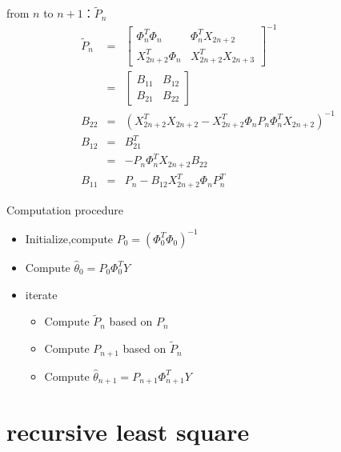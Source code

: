 \begin{frame}{from $n$ to $n+1$：$\tilde P_n$}
\begin{eqnarray*}
\tilde{P}_n &=& 
\begin{bmatrix}
\Phi_n^T\Phi_n & \Phi_n^T X_{2n+2} \\
X_{2n+2}^T\Phi_n    & X_{2n+2}^T X_{2n+3}
\end{bmatrix}^{-1} \\
&=& \begin{bmatrix} B_{11} & B_{12} \\ B_{21} & B_{22} \end{bmatrix} \\
B_{22} &=& (X_{2n+2}^T X_{2n+2}-X_{2n+2}^T\Phi_n P_n\Phi_n^T X_{2n+2})^{-1} \\
B_{12} &=& B_{21}^T \\
&=& -P_n \Phi_n^T X_{2n+2} B_{22} \\
B_{11} &=& P_n- B_{12} X_{2n+2}^T\Phi_n P_n^T
\end{eqnarray*}
\end{frame}


\begin{frame}{Computation procedure}
\begin{itemize}
\item  Initialize,compute $P_0=(\Phi_0^T\Phi_0)^{-1}$
\item  Compute $\hat\theta_0=P_0\Phi_0^T Y$
\item iterate
\begin{itemize}
\item  Compute $\tilde{P}_n$ based on $P_n$
\item  Compute $P_{n+1}$ based on $\tilde{P}_n$
\item  Compute $\hat\theta_{n+1}=P_{n+1}\Phi_{n+1}^T Y$
\end{itemize}
\end{itemize}
\end{frame}

\section{recursive least square}

